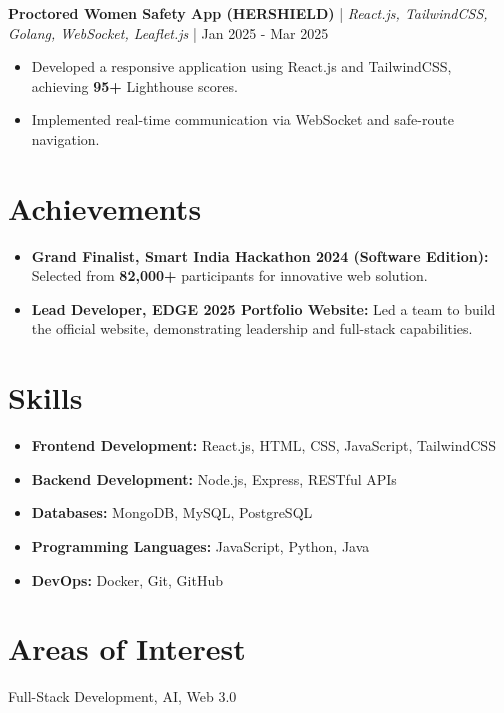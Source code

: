\documentclass{article}
\begin{document}
\textbf{Proctored Women Safety App (HERSHIELD)} | \textit{React.js, TailwindCSS, Golang, WebSocket, Leaflet.js} | Jan 2025 - Mar 2025
\begin{itemize}[leftmargin=*]
    \item Developed a responsive application using React.js and TailwindCSS, achieving \textbf{95+} Lighthouse scores.
    \item Implemented real-time communication via WebSocket and safe-route navigation.
\end{itemize}

\section*{Achievements}
\begin{itemize}[leftmargin=*]
    \item \textbf{Grand Finalist, Smart India Hackathon 2024 (Software Edition):} Selected from \textbf{82,000+} participants for innovative web solution.
    \item \textbf{Lead Developer, EDGE 2025 Portfolio Website:} Led a team to build the official website, demonstrating leadership and full-stack capabilities.
\end{itemize}

\section*{Skills}
\begin{itemize}[leftmargin=*]
    \item \textbf{Frontend Development:} React.js, HTML, CSS, JavaScript, TailwindCSS
    \item \textbf{Backend Development:} Node.js, Express, RESTful APIs
    \item \textbf{Databases:} MongoDB, MySQL, PostgreSQL
    \item \textbf{Programming Languages:} JavaScript, Python, Java
    \item \textbf{DevOps:} Docker, Git, GitHub
\end{itemize}

\section*{Areas of Interest}
Full-Stack Development, AI, Web 3.0
\end{document}
